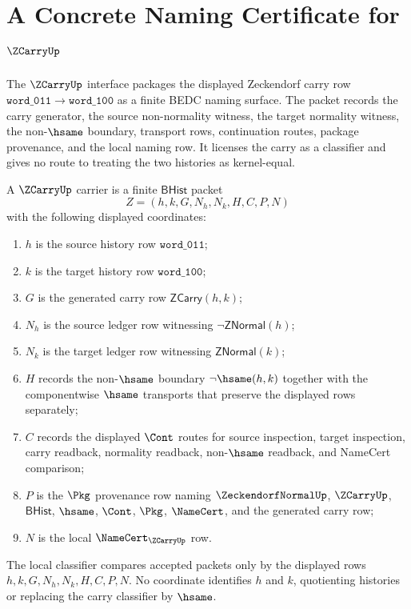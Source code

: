 \chapter{A Concrete Naming Certificate for $\ZCarryUp$}
\label{ch:concrete-instances-zcarry-namecert}

The $\ZCarryUp$ interface packages the displayed Zeckendorf carry row
$\mathtt{word\_011}\to\mathtt{word\_100}$ as a finite BEDC naming surface. The
packet records the carry generator, the source non-normality witness, the target
normality witness, the non-$\hsame$ boundary, transport rows, continuation
routes, package provenance, and the local naming row. It licenses the carry as a
classifier and gives no route to treating the two histories as kernel-equal.

\begin{definition}
\label{def:zcarry-finite-carry-packet}
A $\ZCarryUp$ carrier is a finite $\mathsf{BHist}$ packet
$$
Z=(h,k,G,N_h,N_k,H,C,P,N)
$$
with the following displayed coordinates:
\begin{enumerate}
\item $h$ is the source history row $\mathtt{word\_011}$;
\item $k$ is the target history row $\mathtt{word\_100}$;
\item $G$ is the generated carry row $\mathsf{ZCarry}(h,k)$;
\item $N_h$ is the source ledger row witnessing $\neg\mathsf{ZNormal}(h)$;
\item $N_k$ is the target ledger row witnessing $\mathsf{ZNormal}(k)$;
\item $H$ records the non-$\hsame$ boundary $\neg\hsame(h,k)$ together with the componentwise $\hsame$ transports that preserve the displayed rows separately;
\item $C$ records the displayed $\Cont$ routes for source inspection, target inspection, carry readback, normality readback, non-$\hsame$ readback, and NameCert comparison;
\item $P$ is the $\Pkg$ provenance row naming $\ZeckendorfNormalUp$, $\ZCarryUp$, $\mathsf{BHist}$, $\hsame$, $\Cont$, $\Pkg$, $\NameCert$, and the generated carry row;
\item $N$ is the local $\NameCert_{\ZCarryUp}$ row.
\end{enumerate}
The local classifier compares accepted packets only by the displayed rows
$h,k,G,N_h,N_k,H,C,P,N$. No coordinate identifies $h$ and $k$, quotienting
histories or replacing the carry classifier by $\hsame$.
\end{definition}

